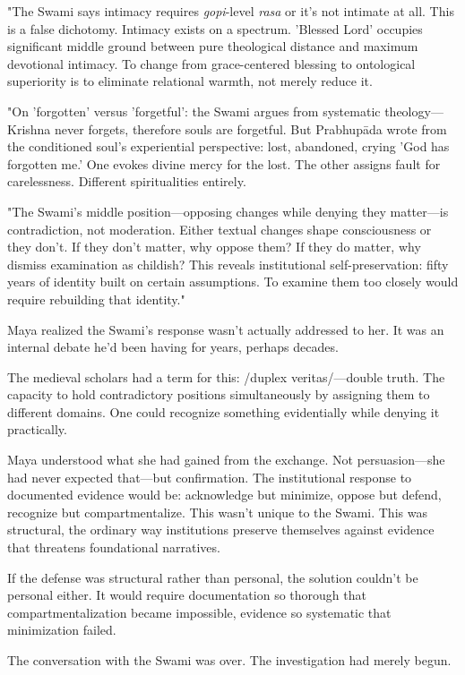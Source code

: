 \documentclass[12pt,twoside]{book}
\begin{document}
"The Swami says intimacy requires \emph{gopi}-level \emph{rasa} or it's not intimate at all. This is a false dichotomy. Intimacy exists on a spectrum. 'Blessed Lord' occupies significant middle ground between pure theological distance and maximum devotional intimacy. To change from grace-centered blessing to ontological superiority is to eliminate relational warmth, not merely reduce it.

"On 'forgotten' versus 'forgetful': the Swami argues from systematic theology—Krishna never forgets, therefore souls are forgetful. But Prabhupāda wrote from the conditioned soul's experiential perspective: lost, abandoned, crying 'God has forgotten me.' One evokes divine mercy for the lost. The other assigns fault for carelessness. Different spiritualities entirely.

"The Swami's middle position—opposing changes while denying they matter—is contradiction, not moderation. Either textual changes shape consciousness or they don't. If they don't matter, why oppose them? If they do matter, why dismiss examination as childish? This reveals institutional self-preservation: fifty years of identity built on certain assumptions. To examine them too closely would require rebuilding that identity."

Maya realized the Swami's response wasn't actually addressed to her. It was an internal debate he'd been having for years, perhaps decades.

The medieval scholars had a term for this: /duplex veritas/—double truth. The capacity to hold contradictory positions simultaneously by assigning them to different domains. One could recognize something evidentially while denying it practically.

Maya understood what she had gained from the exchange. Not persuasion—she had never expected that—but confirmation. The institutional response to documented evidence would be: acknowledge but minimize, oppose but defend, recognize but compartmentalize. This wasn't unique to the Swami. This was structural, the ordinary way institutions preserve themselves against evidence that threatens foundational narratives.

If the defense was structural rather than personal, the solution couldn't be personal either. It would require documentation so thorough that compartmentalization became impossible, evidence so systematic that minimization failed.

The conversation with the Swami was over. The investigation had merely begun.
\end{document}

